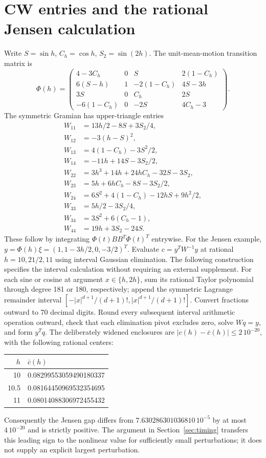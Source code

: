 \section{CW entries and the rational Jensen calculation}
\label{app:interval}
Write $S=\sin h$, $C_h=\cos h$, $S_2=\sin(2h)$. The unit-mean-motion
transition matrix is
\begin{equation}
\Phi(h)=\begin{pmatrix}
4-3C_h&0&S&2(1-C_h)\\
6(S-h)&1&-2(1-C_h)&4S-3h\\
3S&0&C_h&2S\\
-6(1-C_h)&0&-2S&4C_h-3
\end{pmatrix}.
\end{equation}
The symmetric Gramian has upper-triangle entries
\begin{align*}
W_{11}&=13h/2-8S+3S_2/4,\\
W_{12}&=-3(h-S)^2,\\
W_{13}&=4(1-C_h)-3S^2/2,\\
W_{14}&=-11h+14S-3S_2/2,\\
W_{22}&=3h^3+14h+24hC_h-32S-3S_2,\\
W_{23}&=5h+6hC_h-8S-3S_2/2,\\
W_{24}&=6S^2+4(1-C_h)-12hS+9h^2/2,\\
W_{33}&=5h/2-3S_2/4,\\
W_{34}&=3S^2+6(C_h-1),\\
W_{44}&=19h+3S_2-24S.
\end{align*}
These follow by integrating $\Phi(t)BB^T\Phi(t)^T$ entrywise.
For the Jensen example, $y=\Phi(h)\xi=(1,1-3h/2,0,-3/2)^T$.
Evaluate $c=y^TW^{-1}y$ at rational $h=10,21/2,11$ using interval
Gaussian elimination. The following construction specifies the interval
calculation without requiring an external supplement. For each sine or
cosine at argument $x\in\{h,2h\}$, sum its rational Taylor polynomial
through degree 181 or 180, respectively; append the symmetric Lagrange
remainder interval $[-|x|^{d+1}/(d+1)!,|x|^{d+1}/(d+1)!]$.
Convert fractions outward to 70 decimal digits. Round every subsequent
interval arithmetic operation outward, check that each elimination pivot
excludes zero, solve $Wq=y$, and form $y^Tq$.
The deliberately widened enclosures are $|c(h)-\bar c(h)|\le2\,10^{-20}$,
with the following rational centers:
\begin{center}\begin{tabular}{rl}\toprule
$h$&$\bar c(h)$\\\midrule
10&0.08299553059490180337\\
10.5&0.08164450969532354695\\
11&0.08014088306972455432\\\bottomrule
\end{tabular}\end{center}
Consequently the Jensen gap differs from
$7.630286301036810\,10^{-5}$ by at most $4\,10^{-20}$ and is strictly positive.
The argument in Section~\ref{sec:timing} transfers this leading sign to
the nonlinear value for sufficiently small perturbations; it does not
supply an explicit largest perturbation.

